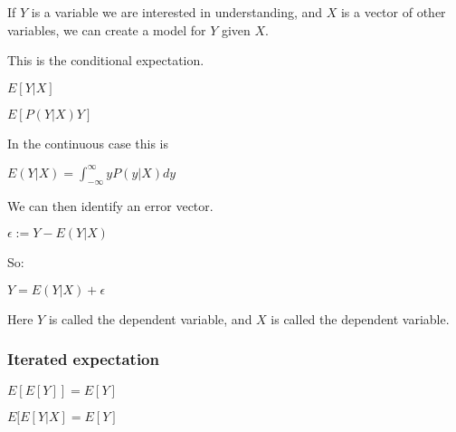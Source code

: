 If \(Y\) is a variable we are interested in understanding, and \(X\) is a vector of other variables, we can create a model for \(Y\) given \(X\).

This is the conditional expectation.

$E[Y|X]$

$E[P(Y|X)Y]$

In the continuous case this is

$E(Y|X)=\int_{-\infty }^{\infty }yP(y|X)dy$

We can then identify an error vector.

$\epsilon :=Y-E(Y|X)$

So:

$Y=E(Y|X)+\epsilon $

Here \(Y\) is called the dependent variable, and \(X\) is called the dependent variable.

\subsubsection{Iterated expectation}

\(E[E[Y]]=E[Y]\)

\(E[E[Y|X]=E[Y]\)

